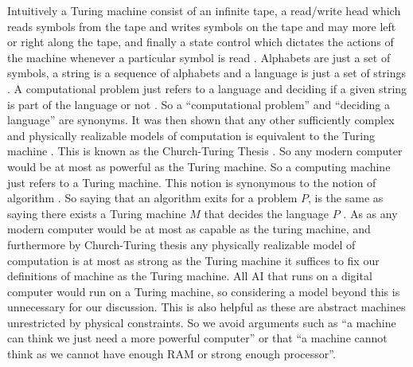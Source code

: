 \documentclass[11pt,a4paper]{article}
\begin{document}
Intuitively a Turing machine consist of an infinite tape, a read/write head which reads symbols from the tape and writes symbols on the tape and may more left or right along the tape, and finally a state control which dictates the actions of the machine whenever a particular symbol is read \cite{sipser13}\cite{Computerphile}.
Alphabets are just a set of symbols, a string is a sequence of alphabets and a language is just a set of strings \cite{sipser13}. 
A computational problem just refers to a language and deciding if a given string is part of the language or not \cite{sipser13}. So a ``computational problem'' and ``deciding a language'' are synonyms. 
It was then shown that any other sufficiently complex and physically realizable models of computation is equivalent to the Turing machine \cite{Turing37} \cite{Church36} \cite{Kleene37}. This is known as the Church-Turing Thesis \cite{sipser13}. 
So any modern computer would be at most as powerful as the Turing machine. So a computing machine just refers to a Turing machine. This notion is synonymous to the notion of algorithm \cite{Arora}. So saying that an algorithm exits for a problem $P$, is the same as saying there exists a Turing machine $M$ that decides the language $P$ \cite{sipser13}.
As as any modern computer would be at most as capable as the turing machine, and furthermore by Church-Turing thesis any physically realizable model of computation is at most as strong as the Turing machine it suffices to fix our definitions of machine as the Turing machine. 
All AI that runs on a digital computer would run on a Turing machine, so considering a model beyond this is unnecessary for our discussion.
This is also helpful as these are abstract machines unrestricted by physical constraints. So we avoid arguments such as ``a machine can think we just need a more powerful computer'' or that ``a machine cannot think as we cannot have enough RAM or strong enough processor''.
\end{document}
